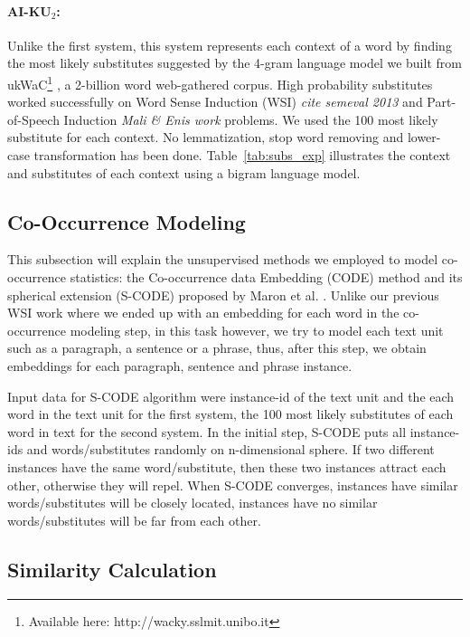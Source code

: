 \documentclass[11pt]{article}
\begin{document}
\paragraph{AI-KU$_2$:} Unlike the first system, this system represents each context of a word by finding the most likely substitutes suggested by the 4-gram language model we built from ukWaC\footnote{Available here: http://wacky.sslmit.unibo.it} \cite{ukWaC}, a 2-billion word web-gathered corpus. High probability substitutes worked successfully on Word Sense Induction (WSI) \emph{cite semeval 2013} and Part-of-Speech Induction \emph{Mali \& Enis work} problems. We used the 100 most likely substitute for each context. No lemmatization, stop word removing and lower-case transformation has been done. Table~\ref{tab:subs_exp} illustrates the context and substitutes of each context using a bigram language model.



\subsection{Co-Occurrence Modeling}

This subsection will explain the unsupervised methods we employed to model co-occurrence statistics: the Co-occurrence data Embedding (CODE) method \cite{globerson-CODE} and its spherical extension (S-CODE) proposed by Maron et al. . Unlike our previous WSI work \cite{baskaya13ai} where we ended up with an embedding for each
word in the co-occurrence modeling step, in this task however, we try to model each text unit such as a paragraph, a sentence or a phrase, thus, after this step, we obtain embeddings for each paragraph, sentence and phrase instance. 

Input data for S-CODE algorithm were instance-id of the text unit and the each word in the text unit for the first system, the 100 most likely substitutes of each word in text for the second system. In the initial step, S-CODE puts all instance-ids and words/substitutes randomly on n-dimensional sphere. If two different instances have the same word/substitute, then these two instances attract each other, otherwise they will repel. When S-CODE converges, instances have similar words/substitutes will be closely located, instances have no similar words/substitutes will be far from each other. 



\subsection{Similarity Calculation}
\end{document}
